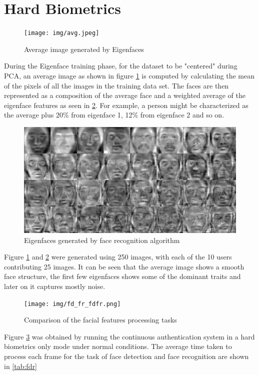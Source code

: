 \documentclass[12pt]{report}			%
\begin{document}
\section{Hard Biometrics}
\begin{figure}[h!]
	\centering
	\texttt{[image: img/avg.jpeg]}
	\caption{Average image generated by Eigenfaces}
	\label{fig:avg}
\end{figure}
During the Eigenface training phase, for the dataset to be "centered" during PCA, an average image as shown in figure \ref{fig:avg} is computed by calculating the mean of the pixels of all the images in the training data set. 
The faces are then represented as a composition of the average face and a weighted average of the eigenface features as seen in \ref{fig:eigen}.
For example, a person might be characterized as the average plus 20\% from eigenface 1, 12\% from eigenface 2 and so on.
\begin{figure}[h!]
	\centering
	\includegraphics[scale=0.15]{img/eigen.png}
	\caption{Eigenfaces generated by face recognition algorithm}
	\label{fig:eigen}
\end{figure}
Figure \ref{fig:avg} and \ref{fig:eigen} were generated using 250 images, with each of the 10 users contributing 25 images.
It can be seen that the average image shows a smooth face structure, the first few eigenfaces shows some of the dominant traits and later on it captures mostly noise.

\begin{figure}[h!]
	\centering
	\texttt{[image: img/fd\_fr\_fdfr.png]}
	\caption{Comparison of the facial features processing tasks}
	\label{fig:fdfr}
\end{figure}
Figure \ref{fig:fdfr} was obtained by running the continuous authentication system in a hard biometrics only mode under normal conditions. The average time taken to process each frame for the task of face detection and face recognition are shown in \ref{tab:fdr}
\end{document}
